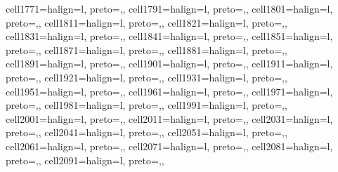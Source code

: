 \begin{table}
\begin{talltblr}
{cell{177}{1}={}{halign=l, preto={\hspace{1em}},},
cell{179}{1}={}{halign=l, preto={\hspace{1em}},},
cell{180}{1}={}{halign=l, preto={\hspace{1em}},},
cell{181}{1}={}{halign=l, preto={\hspace{1em}},},
cell{182}{1}={}{halign=l, preto={\hspace{1em}},},
cell{183}{1}={}{halign=l, preto={\hspace{1em}},},
cell{184}{1}={}{halign=l, preto={\hspace{1em}},},
cell{185}{1}={}{halign=l, preto={\hspace{1em}},},
cell{187}{1}={}{halign=l, preto={\hspace{1em}},},
cell{188}{1}={}{halign=l, preto={\hspace{1em}},},
cell{189}{1}={}{halign=l, preto={\hspace{1em}},},
cell{190}{1}={}{halign=l, preto={\hspace{1em}},},
cell{191}{1}={}{halign=l, preto={\hspace{1em}},},
cell{192}{1}={}{halign=l, preto={\hspace{1em}},},
cell{193}{1}={}{halign=l, preto={\hspace{1em}},},
cell{195}{1}={}{halign=l, preto={\hspace{1em}},},
cell{196}{1}={}{halign=l, preto={\hspace{1em}},},
cell{197}{1}={}{halign=l, preto={\hspace{1em}},},
cell{198}{1}={}{halign=l, preto={\hspace{1em}},},
cell{199}{1}={}{halign=l, preto={\hspace{1em}},},
cell{200}{1}={}{halign=l, preto={\hspace{1em}},},
cell{201}{1}={}{halign=l, preto={\hspace{1em}},},
cell{203}{1}={}{halign=l, preto={\hspace{1em}},},
cell{204}{1}={}{halign=l, preto={\hspace{1em}},},
cell{205}{1}={}{halign=l, preto={\hspace{1em}},},
cell{206}{1}={}{halign=l, preto={\hspace{1em}},},
cell{207}{1}={}{halign=l, preto={\hspace{1em}},},
cell{208}{1}={}{halign=l, preto={\hspace{1em}},},
cell{209}{1}={}{halign=l, preto={\hspace{1em}},},
}
\end{talltblr}
\end{table}
